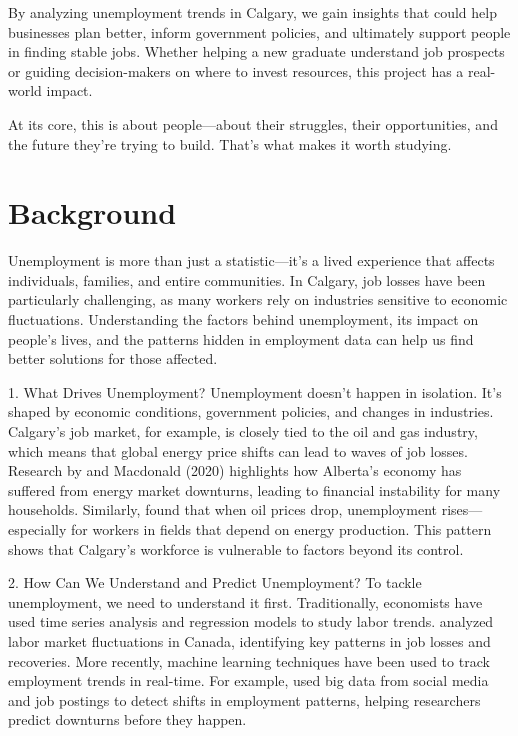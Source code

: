 \documentclass[11pt]{article}
\begin{document}
By analyzing unemployment trends in Calgary, we gain insights that could help businesses plan better, inform government policies, and ultimately support people in finding stable jobs. Whether helping a new graduate understand job prospects or guiding decision-makers on where to invest resources, this project has a real-world impact.

At its core, this is about people—about their struggles, their opportunities, and the future they’re trying to build. That’s what makes it worth studying.
\section{Background}
Unemployment is more than just a statistic—it’s a lived experience that affects individuals, families, and entire communities. In Calgary, job losses have been particularly challenging, as many workers rely on industries sensitive to economic fluctuations. Understanding the factors behind unemployment, its impact on people’s lives, and the patterns hidden in employment data can help us find better solutions for those affected.

1. What Drives Unemployment?\newline
Unemployment doesn’t happen in isolation. It’s shaped by economic conditions, government policies, and changes in industries. Calgary’s job market, for example, is closely tied to the oil and gas industry, which means that global energy price shifts can lead to waves of job losses. Research by \cite{baldwin2020impact} and Macdonald (2020) highlights how Alberta’s economy has suffered from energy market downturns, leading to financial instability for many households. Similarly, \cite{marchand2012distributional} found that when oil prices drop, unemployment rises—especially for workers in fields that depend on energy production. This pattern shows that Calgary’s workforce is vulnerable to factors beyond its control.

2. How Can We Understand and Predict Unemployment?\newline
To tackle unemployment, we need to understand it first. Traditionally, economists have used time series analysis and regression models to study labor trends. \cite{riddell1998labor} analyzed labor market fluctuations in Canada, identifying key patterns in job losses and recoveries. More recently, machine learning techniques have been used to track employment trends in real-time. For example, \cite{pappas2018bigdata} used big data from social media and job postings to detect shifts in employment patterns, helping researchers predict downturns before they happen.
\end{document}

